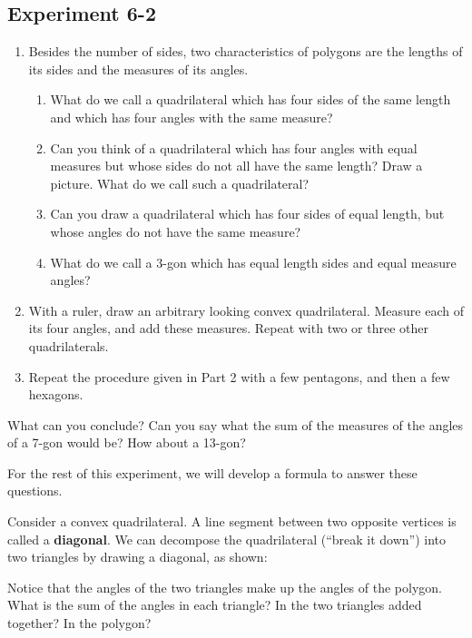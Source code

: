 \documentclass[12pt]{book} %
\begin{document}

\subsection*{Experiment 6-2}

\begin{enumerate}
\item Besides the number of sides, two characteristics of polygons are the lengths of its sides and the measures of its angles.
\begin{enumerate}
\item[(a)] What do we call a quadrilateral which has four sides of the same length and which has four angles with the same measure?

\item[(b)] Can you think of a quadrilateral which has four angles with equal measures but whose sides do not all have the same length? Draw a picture. What do we call such a quadrilateral?

\item[(c)] Can you draw a quadrilateral which has four sides of equal length, but whose angles do not have the same measure?

\item[(d)] What do we call a 3-gon which has equal length sides and equal measure angles?
\end{enumerate}

\item With a ruler, draw an arbitrary looking convex quadrilateral. Measure each of its four angles, and add these measures. Repeat with two or three other quadrilaterals.

\item Repeat the procedure given in Part 2 with a few pentagons, and then a few hexagons.
\end{enumerate}

What can you conclude? Can you say what the sum of the measures of the angles of a 7-gon would be? How about a 13-gon?

For the rest of this experiment, we will develop a formula to answer these questions.

Consider a convex quadrilateral. A line segment between two opposite vertices is called a \textbf{diagonal}. We can decompose the quadrilateral (``break it down'') into two triangles by drawing a diagonal, as shown:


Notice that the angles of the two triangles make up the angles of the polygon. What is the sum of the angles in each triangle? In the two triangles added together? In the polygon?
\end{document}
